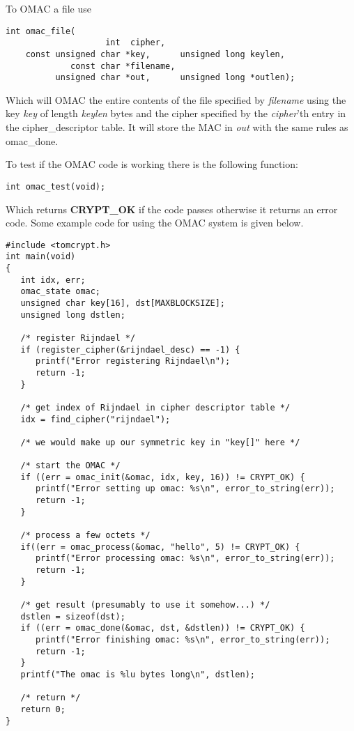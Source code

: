 \documentclass[synpaper]{book}
\begin{document}
To OMAC a file use
\begin{verbatim}
int omac_file(
                    int  cipher, 
    const unsigned char *key,      unsigned long keylen,
             const char *filename, 
          unsigned char *out,      unsigned long *outlen);
\end{verbatim}

Which will OMAC the entire contents of the file specified by \textit{filename} using the key \textit{key} of length \textit{keylen} bytes
and the cipher specified by the \textit{cipher}'th entry in the cipher\_descriptor table.  It will store the MAC in \textit{out} with 
the same rules as omac\_done.

To test if the OMAC code is working there is the following function:
\begin{verbatim}
int omac_test(void);
\end{verbatim}
Which returns {\bf CRYPT\_OK} if the code passes otherwise it returns an error code.  Some example code for using the 
OMAC system is given below.

\begin{small}
\begin{verbatim}
#include <tomcrypt.h>
int main(void)
{
   int idx, err;
   omac_state omac;
   unsigned char key[16], dst[MAXBLOCKSIZE];
   unsigned long dstlen;

   /* register Rijndael */
   if (register_cipher(&rijndael_desc) == -1) {
      printf("Error registering Rijndael\n");
      return -1;
   }

   /* get index of Rijndael in cipher descriptor table */
   idx = find_cipher("rijndael");

   /* we would make up our symmetric key in "key[]" here */

   /* start the OMAC */
   if ((err = omac_init(&omac, idx, key, 16)) != CRYPT_OK) {
      printf("Error setting up omac: %s\n", error_to_string(err));
      return -1;
   }

   /* process a few octets */
   if((err = omac_process(&omac, "hello", 5) != CRYPT_OK) {
      printf("Error processing omac: %s\n", error_to_string(err));
      return -1;
   }

   /* get result (presumably to use it somehow...) */
   dstlen = sizeof(dst);
   if ((err = omac_done(&omac, dst, &dstlen)) != CRYPT_OK) {
      printf("Error finishing omac: %s\n", error_to_string(err));
      return -1;
   }
   printf("The omac is %lu bytes long\n", dstlen);
  
   /* return */
   return 0;
}
\end{verbatim}
\end{small}
\end{document}
